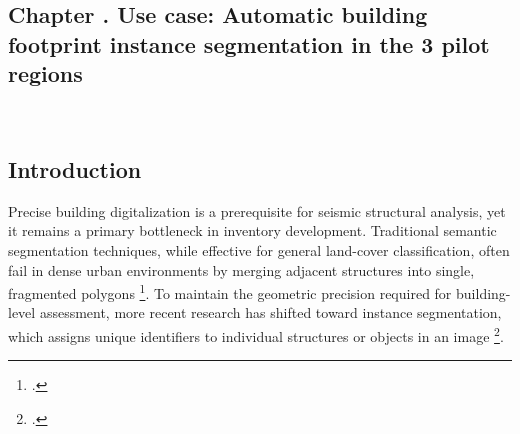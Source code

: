 \graphicspath{
    {figures_and_references/urban_surface_detection/}
    {figures_and_references/EELISA_conference/}
    {figures_and_references/footprints_paper/}
}

\renewcommand{\chapternametext}{Chapter \thechapter . Use case: Automatic building footprint instance segmentation in the 3 pilot regions}
\renewcommand{\shortchapternametext}{Chapter \thechapter . Use case: Automatic building footprint instance segmentation}

\begin{refsection}

\chapter{\chapternametext}
\

\renewcommand{\headingtextL}{}
\renewcommand{\headingtextR}{\shortchapternametext}
\begingroup
 \flushbottom
 \setlength{\parskip}{0pt plus 1fil}%
 \localtableofcontents 
\endgroup

\begingroup
 \flushbottom
 \setlength{\parskip}{0pt plus 1fil}%
 \locallistoffigures
 \locallistoftables
\endgroup


\newpage

\setcounter{section}{0} 



\FloatBarrier

\renewcommand{\sectionnametext}{Introduction}
\renewcommand{\headingtextL}{\shortchapternametext}
\renewcommand{\headingtextR}{\thesection. \sectionnametext}
\section{\sectionnametext}


Precise building digitalization is a prerequisite for seismic structural analysis, yet it remains a primary bottleneck in inventory development. Traditional semantic segmentation techniques, while effective for general land-cover classification, often fail in dense urban environments by merging adjacent structures into single, fragmented polygons \footcite{ji_fully_2019, torres_using_2023}. To maintain the geometric precision required for building-level assessment, more recent research has shifted toward instance segmentation, which assigns unique identifiers to individual structures or objects in an image \footcite{chen_large-scale_2023}.


\end{refsection}
